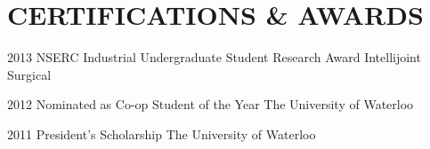 \documentclass[a4paper,nocolors]{cv-friggeri-ben}
\begin{document}

\section{CERTIFICATIONS \& AWARDS}
\vspace{-2pt}

\begin{entrylist}


\entry
    {2013}
    {NSERC Industrial Undergraduate Student Research Award}
    {Intellijoint Surgical}
    {\vspace{-11pt}}

\entry
    {2012}
    {Nominated as Co-op Student of the Year}
    {The University of Waterloo}
    {\vspace{-11pt}}

\entry
    {2011}
    {President's Scholarship}
    {The University of Waterloo}
    {\vspace{-11pt}}

\end{entrylist}



\thispagestyle{fancy}  %
\fancyfootoffset[L]{4.6cm}  %
\fancyhf{}  %
\end{document}
